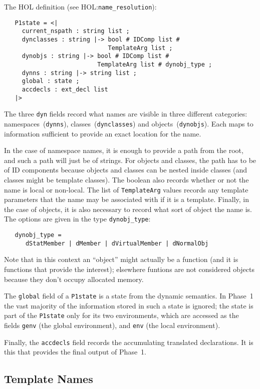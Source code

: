\documentclass[11pt]{article}
\newcommand{\HOLfile}[1]{HOL:\texttt{#1}}
\begin{document}
The HOL definition (see \HOLfile{name_resolution}): 
\begin{verbatim}
   P1state = <|
     current_nspath : string list ;
     dynclasses : string |-> bool # IDComp list # 
                             TemplateArg list ;
     dynobjs : string |-> bool # IDComp list # 
                          TemplateArg list # dynobj_type ;
     dynns : string |-> string list ;
     global : state ;
     accdecls : ext_decl list 
   |>
\end{verbatim}
The three \texttt{dyn} fields record what names are visible in three
different categories: namespaces~(\texttt{dynns}),
classes~(\texttt{dynclasses}) and objects~(\texttt{dynobjs}).  Each
maps to information sufficient to provide an exact location for the
name.  

In the case of namespace names, it is enough to provide a path from
the root, and such a path will just be of strings.  For objects and
classes, the path has to be of ID components because objects and
classes can be nested inside classes (and classes might be template
classes).  The boolean also records whether or not the name is local
or non-local.  The list of \texttt{TemplateArg} values records any
template parameters that the name may be associated with if it is a
template.  Finally, in the case of objects, it is also necessary to
record what sort of object the name is.  The options are given in the
type \texttt{dynobj_type}: 
\begin{verbatim}
   dynobj_type = 
      dStatMember | dMember | dVirtualMember | dNormalObj
\end{verbatim}
Note that in this context an ``object'' might actually be a function
(and it is functions that provide the interest); elsewhere funtions
are not considered objects because they don't occupy allocated
memory. 

The \texttt{global} field of a \texttt{P1state} is a state from the
dynamic semantics.  In Phase~1 the vast majority of the information
stored in such a state is ignored; the state is part of the
\texttt{P1state} only for its two environments, which are accessed as
the fields \texttt{genv} (the global environment), and \texttt{env}
(the local environment). 

Finally, the \texttt{accdecls} field records the accumulating
translated declarations.  It is this that provides the final output of
Phase~1.  

\subsection{Template Names}
\end{document}
